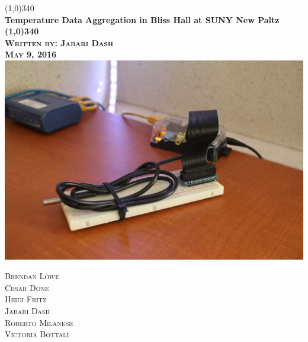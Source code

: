 \documentclass{article}
\begin{document}
	\begin{titlepage}
		\begin{center}
			\line(1,0){340}\\
			[0.25in]
			\huge\bfseries Temperature Data Aggregation in Bliss Hall at SUNY New Paltz\\
			[2mm]
			\line(1,0){340}\\
			[1.1cm]
			\textsc{\Large Written by: Jabari Dash\\ May 9, 2016}\\
			[1cm]
			\includegraphics[scale=.15]{rpi.jpg}\\
			[1cm]
		\end{center}
		
		\begin{flushright}
			\textsc{\Large Brendan Lowe\\
				Cesar Done\\
				Heidi Fritz\\
				Jabari Dash\\
				Roberto Milanese\\
				Victoria Bottali\\}
		\end{flushright}
	\end{titlepage}
	
	\tableofcontents
	
	\newpage	
\end{document}
